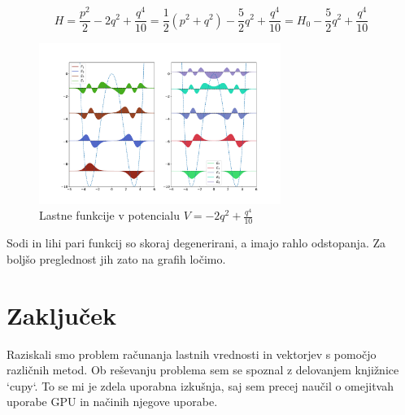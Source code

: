 \documentclass{article}
\begin{document}
\begin{equation*}
	H = \frac{p^2}{2} - 2 q^2 + \frac{q^4}{10} = \frac{1}{2} (p^2 + q^2) - \frac{5}{2}q^2 + \frac{q^4}{10} = H_0 - \frac{5}{2}q^2 + \frac{q^4}{10}
\end{equation*}
\begin{figure}[H]
    \centering
	\includegraphics[width=0.7\textwidth]{extra.pdf}
	\caption{Lastne funkcije v potencialu $V=-2q^2 + \frac{q^4}{10}$} 
\end{figure}
Sodi in lihi pari funkcij so skoraj degenerirani, a imajo rahlo odstopanja. Za boljšo preglednost jih zato na grafih ločimo.
\section{Zaključek}
Raziskali smo problem računanja lastnih vrednosti in vektorjev s pomočjo različnih metod. Ob reševanju problema sem se spoznal z delovanjem knjižnice `cupy`. To se mi je zdela uporabna izkušnja, saj sem precej naučil o omejitvah uporabe GPU in načinih njegove uporabe.  
\end{document}
